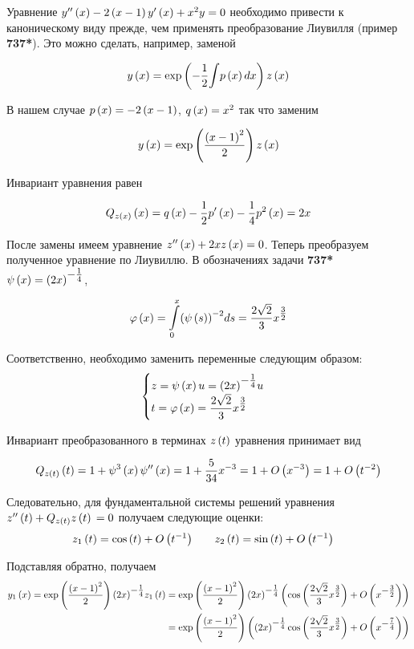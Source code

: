 \documentclass[a5paper,10pt]{article}
\begin{document}
Уравнение $y''\left(x\right) - 2\left(x - 1\right) y'\left(x\right) + x^{2} y = 0$ необходимо привести к каноническому виду прежде, чем применять преобразование Лиувилля (пример \textbf{737*}). Это можно сделать, например, заменой 

$$y\br{x} = \exp \br{- \frac {1} {2} \tint {p\br{x} dx} } z\br{x} $$

В нашем случае $p\left(x\right) = -2\left(x - 1\right)$, $q\left(x\right) = x^2$ так что заменим 

$$y\left(x\right) = \exp\left(\frac {\left(x - 1\right)^2} {2}\right) z\left(x\right)$$

Инвариант уравнения равен

$$Q_{z\left(x\right)} \left(x\right) = q\left(x\right) - \frac {1} {2} p'\left(x\right) - \frac {1} {4} p^{2}\left(x\right) = 2x$$

После замены имеем уравнение $z''\left(x\right) + 2x z\left(x\right) = 0$. Теперь преобразуем полученное уравнение по Лиувиллю. В обозначениях задачи \textbf{737*} $\psi\br{x} = \tpow {\br{2x}} {-\frac {1} {4}}$,

$$\phi\br{x} = \tintlim{0}{x} {\br{\psi\br{s}}^{-2}} ds = \frac {2\sqrt{2}} {3} \tpow{x}{\frac {3} {2}}$$

Соответственно, необходимо заменить переменные следующим образом:
$$
\begin{cases}
z = \psi\br{x} u = \tpow {\br{2x}} {-\frac {1} {4}} u \\
t = \phi\br{x} = \dfrac {2\sqrt{2}} {3} \tpow {x} {\frac {3} {2}}
\end{cases}
$$

Инвариант преобразованного в терминах $z\left(t\right)$ уравнения принимает вид

$$Q_{z\left(t\right)}\left(t\right) = 1 + \psi^3\left(x\right) \psi''\left(x\right) = 1 + \frac {5} {34} x^{-3} = 1 + O\left(x^{-3}\right) = 1 + O\left(t^{-2}\right)$$

Следовательно, для фундаментальной системы решений уравнения $z''\left(t\right) + Q_{z\left(t\right)} z\left(t\right) \\ = 0$ получаем следующие оценки:
\begin{align*}
z_{1}\left(t\right) = \cos\left(t\right) + O\left(t^{-1}\right) \qquad & z_{2}\left(t\right) = \sin\left(t\right) + O\left(t^{-1}\right)
\end{align*}

Подставляя обратно, получаем
\begin{align*}
  y_{1}\br{x} = \exp\br{\frac {\br{x - 1}^2} {2}} \tpow {\br{2x}}{-\frac {1} {4}} z_{1}\br{t} 
  = \exp\br{\frac {\br{x - 1}^2} {2}} \tpow {\br{2x}}{-\frac {1} {4}} \br{\cos\br{\frac {2\sqrt{2}} {3} \tpow{x}{\frac {3} {2}}} + O\br{\tpow {x} {-\frac {3} {2}}}} \\ 
  = \exp\br{\frac {\br{x - 1}^2} {2}} \br{ \tpow {\br{2x}}{-\frac {1} {4}} \cos\br{\frac {2\sqrt{2}} {3} \tpow{x}{\frac {3} {2}}} + O\br{\tpow{x} {-\frac {7} {4}}}}
\end{align*}
\end{document}
